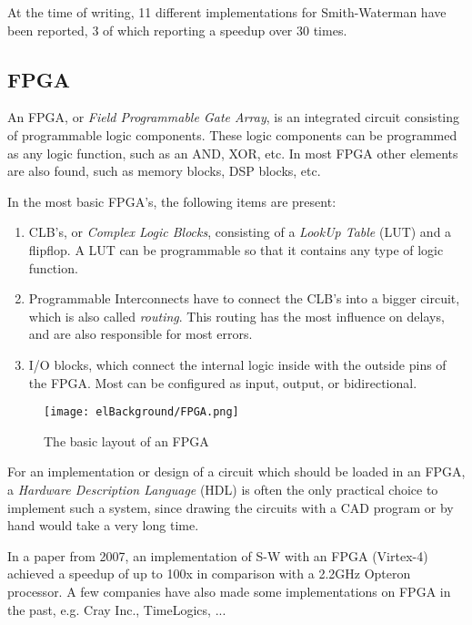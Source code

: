 At the time of writing, 11 different implementations for Smith-Waterman have been reported, 3 of which reporting a speedup over 30 times.

\subsection{FPGA}

An FPGA, or \emph{Field Programmable Gate Array}, is an integrated circuit consisting of programmable logic components. These logic components can be programmed as any logic function, such as an AND, XOR, etc. In most FPGA other elements are also found, such as memory blocks, DSP blocks, etc.

In the most basic FPGA's, the following items are present:
\begin{enumerate}
	\item CLB's, or \emph{Complex Logic Blocks}, consisting of a \emph{LookUp Table} (LUT) and a flipflop. A LUT can be programmable so that it contains any type of logic function.
	\item Programmable Interconnects have to connect the CLB's into a bigger circuit, which is also called \emph{routing}. This routing has the most influence on delays, and are also responsible for most errors.
	\item I/O blocks, which connect the internal logic inside with the outside pins of the FPGA. Most can be configured as input, output, or bidirectional.
\end{enumerate}

\begin{figure}[H]
	\centering
	\texttt{[image: elBackground/FPGA.png]}
	\caption{The basic layout of an FPGA}
	\label{fig:fpga}
\end{figure}

For an implementation or design of a circuit which should be loaded in an FPGA, a \emph{Hardware Description Language} (HDL) is often the only practical choice to implement such a system, since drawing the circuits with a CAD program or by hand would take a very long time.

In a paper from 2007, an implementation of S-W with an FPGA (Virtex-4) achieved a speedup of up to 100x in comparison with a 2.2GHz Opteron processor. %
A few companies have also made some implementations on FPGA in the past, e.g. Cray Inc., TimeLogics, ...

